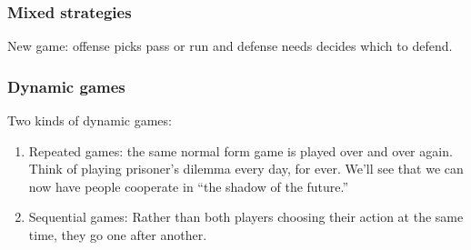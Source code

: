 \documentclass[xcolor=pdftex,dvipsnames]{beamer}
\begin{document}
  \begin{frame}
    \frametitle{Mixed strategies}
    New game: offense picks pass or run and defense needs decides which to defend.

\bigskip

\bigskip



  \end{frame}




  \begin{frame}
    \frametitle{Dynamic games}
    Two kinds of dynamic games:
    \begin{enumerate}[<+->]
    \item Repeated games: the same normal form game is played over and
      over again. Think of playing prisoner's dilemma every day, for
      ever.
      We'll see that we can now have people cooperate in ``the shadow
      of the future.''

    \item Sequential games: Rather than both players choosing their
      action at the same time, they go one after another. 
    \end{enumerate}
\end{frame}
\end{document}
